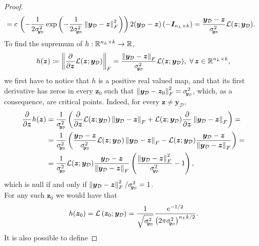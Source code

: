 \begin{proof}
\begin{equation*}
\begin{aligned}
			& = c \, \left(- \frac{1}{2 \sigmay^2} \exp{-\frac{1}{2\sigmay^2} \norm{\bm{y}_{\mathcal{D}} - \bm{z}}_F^2}\right) 2 (\bm{y}_{\mathcal{D}} - \bm{z}) \left(- \bm{I}_{n_L \times k}\right) = \frac{\bm{y}_{\mathcal{D}} - \bm{z}}{\sigmay^2} \mathcal{L}(\bm{z}; \bm{y}_{\mathcal{D}}).
		\end{aligned}
	\end{equation*}
	To find the supremum of $h: \mathbb{R}^{n_L \times k} \to \mathbb{R}$, 
	\begin{equation*}
		h(\bm{z}) \coloneqq \norm{\frac{\partial}{\partial \bm{z}} \mathcal{L}(\bm{z}; \bm{y}_{\mathcal{D}})}_F = \frac{\norm{\bm{y}_{\mathcal{D}} - \bm{z}}_F}{\sigmay^2} \mathcal{L}(\bm{z}; \bm{y}_{\mathcal{D}}), \ \forall \bm{z} \in \real^{n_L \times k},
	\end{equation*}
	we first have to notice that $h$ is a positive real valued map, and that its first derivative has zeros in every $\bm{z}_0$ such that $\norm{\bm{y}_{\mathcal{D}} - \bm{z}_0}_F^2 = \sigmay^2$, which, as a consequence, are critical points. Indeed, for every $\bm{z} \neq \bm{y}_{\mathcal{D}}$,
	\begin{align*}
		\frac{\partial}{\partial \bm{z}} h(\bm{z}) & = \frac{1}{\sigmay^2} \left(\frac{\partial}{\partial \bm{z}} \mathcal{L}(\bm{z}; \bm{y}_{\mathcal{D}}) \norm{\bm{y}_{\mathcal{D}} - \bm{z}}_F + \mathcal{L}(\bm{z}; \bm{y}_{\mathcal{D}}) \frac{\partial}{\partial \bm{z}} \norm{\bm{y}_{\mathcal{D}} - \bm{z}}_F\right) = \\
		& = \frac{1}{\sigmay^2} \left(\frac{\bm{y}_{\mathcal{D}} - \bm{z}}{\sigmay^2} \mathcal{L}(\bm{z}; \bm{y}_{\mathcal{D}}) \norm{\bm{y}_{\mathcal{D}} - \bm{z}}_F - \mathcal{L}(\bm{z}; \bm{y}_{\mathcal{D}}) \frac{\bm{y}_{\mathcal{D}} - \bm{z}}{\norm{\bm{y}_{\mathcal{D}} - \bm{z}}_F}\right) = \\
		& = \frac{1}{\sigmay^2} \mathcal{L}(\bm{z}; \bm{y}_{\mathcal{D}}) \frac{\bm{y}_{\mathcal{D}} - \bm{z}}{\norm{\bm{y}_{\mathcal{D}} - \bm{z}}_F} \left(\frac{\norm{\bm{y}_{\mathcal{D}} - \bm{z}}_F^2}{\sigmay^2} - 1\right),
	\end{align*}
	which is null if and only if $\norm{\bm{y}_{\mathcal{D}} - \bm{z}}_F^2 / \sigmay^2 = 1$. \\
	For any such $\bm{z}_0$ we would have that
	\begin{equation*}
		h(\bm{z}_0) = \mathcal{L}\left(\bm{z}_0; \bm{y}_{\mathcal{D}}\right) = \frac{1}{\sqrt{\sigmay^2}} \frac{e^{-1/2}}{\left(2 \pi \sigmay^2\right)^{n_L k / 2}}.
	\end{equation*}
	It is also possible to define 

\end{proof}
